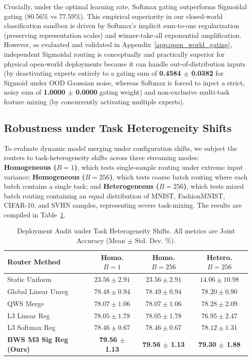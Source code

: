Crucially, under the optimal learning rate, Softmax gating outperforms Sigmoidal gating (80.56\% vs 77.59\%). This empirical superiority in our closed-world classification sandbox is driven by Softmax's implicit sum-to-one regularization (preserving representation scales) and winner-take-all exponential amplification. However, as evaluated and validated in Appendix~\ref{app:open_world_gating}, independent Sigmoidal routing is conceptually and practically superior for physical open-world deployments because it can handle out-of-distribution inputs (by deactivating experts entirely to a gating sum of \textbf{0.4584 $\pm$ 0.0382} for Sigmoid under OOD Gaussian noise, whereas Softmax is forced to inject a strict, noisy sum of \textbf{1.0000 $\pm$ 0.0000} gating weight) and non-exclusive multi-task feature mixing (by concurrently activating multiple experts).

\subsection{Robustness under Task Heterogeneity Shifts}
To evaluate dynamic model merging under configuration shifts, we subject the routers to task-heterogeneity shifts across three streaming modes: \textbf{Homogeneous ($B=1$)}, which tests single-sample routing under extreme input variance; \textbf{Homogeneous ($B=256$)}, which tests coarse batch routing where each batch contains a single task; and \textbf{Heterogeneous ($B=256$)}, which tests mixed batch routing containing an equal distribution of MNIST, FashionMNIST, CIFAR-10, and SVHN samples, representing severe task-mixing. The results are compiled in Table~\ref{tab:hetero_results}.

\begin{table}[h]
\caption{Deployment Audit under Task Heterogeneity Shifts. All metrics are Joint Accuracy (Mean $\pm$ Std. Dev. \%).}
\label{tab:hetero_results}
\vskip 0.1in
\begin{center}
\begin{footnotesize}
\setlength{\tabcolsep}{2.5pt}
\begin{tabular}{lccc}
\toprule
\textbf{Router Method} & \textbf{Homo. $B=1$} & \textbf{Homo. $B=256$} & \textbf{Hetero. $B=256$} \\
\midrule
Static Uniform & $23.56 \pm 2.91$ & $23.56 \pm 2.91$ & $14.06 \pm 10.98$ \\
Global Linear Unreg & $78.48 \pm 0.94$ & $78.49 \pm 0.94$ & $78.20 \pm 0.90$ \\
QWS Merge & $78.07 \pm 1.06$ & $78.07 \pm 1.06$ & $78.28 \pm 2.09$ \\
L3 Linear Reg & $78.05 \pm 1.78$ & $78.05 \pm 1.78$ & $76.95 \pm 2.47$ \\
L3 Softmax Reg & $78.46 \pm 0.67$ & $78.46 \pm 0.67$ & $78.12 \pm 1.31$ \\
\midrule
\textbf{BWS M3 Sig Reg (Ours)} & \textbf{79.56 $\pm$ 1.13} & \textbf{79.56 $\pm$ 1.13} & \textbf{79.30 $\pm$ 1.88} \\
\bottomrule
\end{tabular}
\end{footnotesize}
\end{center}
\vskip -0.15in
\end{table}

